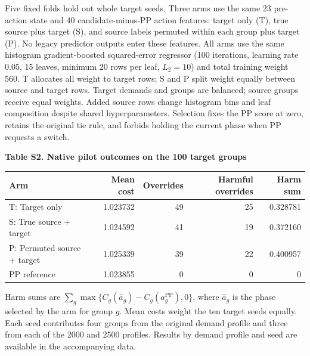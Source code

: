 \documentclass[letterpaper,10pt]{article}
\begin{document}
Five fixed folds hold out whole target seeds. Three arms use the same 23 pre-action state and 40 candidate-minus-PP action features: target only (T), true source plus target (S), and source labels permuted within each group plus target (P). No legacy predictor outputs enter these features. All arms use the same histogram gradient-boosted squared-error regressor (100 iterations, learning rate 0.05, 15 leaves, minimum 20 rows per leaf, $L_2=10$) and total training weight 560. T allocates all weight to target rows; S and P split weight equally between source and target rows. Target demands and groups are balanced; source groups receive equal weights. Added source rows change histogram bins and leaf composition despite shared hyperparameters. Selection fixes the PP score at zero, retains the original tie rule, and forbids holding the current phase when PP requests a switch.

\begin{center}
\textbf{Table S2. Native pilot outcomes on the 100 target groups}\\[4pt]
\begin{tabular}{@{}lrrrr@{}}
\toprule
Arm & Mean cost & Overrides & Harmful overrides & Harm sum\\
\midrule
T: Target only & 1.023732 & 49 & 25 & 0.328781\\
S: True source + target & 1.024592 & 41 & 19 & 0.372160\\
P: Permuted source + target & 1.025339 & 39 & 22 & 0.400957\\
PP reference & 1.023855 & 0 & 0 & 0\\
\bottomrule
\end{tabular}
\end{center}
Harm sums are $\sum_g\max\{C_g(\widehat a_g)-C_g(a_g^{\mathrm{PP}}),0\}$, where $\widehat a_g$ is the phase selected by the arm for group $g$. Mean costs weight the ten target seeds equally. Each seed contributes four groups from the original demand profile and three from each of the 2000 and 2500 profiles. Results by demand profile and seed are available in the accompanying data.
\end{document}
